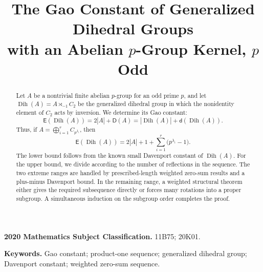 \documentclass[11pt]{article}
\title{The Gao Constant of Generalized Dihedral Groups\\
with an Abelian \(p\)-Group Kernel, \(p\) Odd}
\author{}
\date{}
\theoremstyle{definition}
\newcommand{\E}{\mathsf E}
\newcommand{\dsmall}{\mathsf d}
\newcommand{\D}{\mathsf D}
\newcommand{\Dih}{\operatorname{Dih}}
\begin{document}
\maketitle

\begin{abstract}
Let \(A\) be a nontrivial finite abelian \(p\)-group for an odd prime
\(p\), and let \(\Dih(A)=A\rtimes_{-1}C_2\) be the generalized
dihedral group in which the nonidentity element of \(C_2\) acts by
inversion. We determine its Gao constant:
\[
  \E(\Dih(A))=2|A|+\D(A)
  =|\Dih(A)|+\dsmall(\Dih(A)).
\]
Thus, if \(A=\bigoplus_{i=1}^r C_{p^{\lambda_i}}\), then
\[
  \E(\Dih(A))
  =2|A|+1+\sum_{i=1}^r\bigl(p^{\lambda_i}-1\bigr).
\]
The lower bound follows from the known small Davenport constant of
\(\Dih(A)\). For the upper bound, we divide according to the number of
reflections in the sequence. The two extreme ranges are handled by
prescribed-length weighted zero-sum results and a plus-minus Davenport
bound. In the remaining range, a weighted structural theorem either
gives the required subsequence directly or forces many rotations into a
proper subgroup. A simultaneous induction on the subgroup order
completes the proof.
\end{abstract}

\noindent\textbf{2020 Mathematics Subject Classification.} 11B75; 20K01.\par
\noindent\textbf{Keywords.} Gao constant; product-one sequence; generalized dihedral group; Davenport constant; weighted zero-sum sequence.










\end{document}
